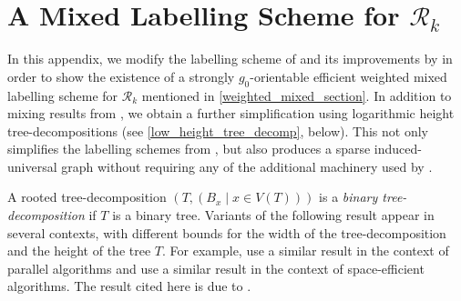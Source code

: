 \documentclass{patmorin}
\newcommand{\vida}[1]{\noindent{\color{pink} VD: #1}}
\newcommand{\defin}[1]{\emph{\textcolor{brightmaroon}{#1}}}
\newcommand{\calR}{\mathcal{R}}
\begin{document}
\setlength{\bibsep}{0.3ex plus 0.1ex minus 0.1ex}



\newpage
\appendix
{}
\section{A Mixed Labelling Scheme for \texorpdfstring{$\calR_k$}{Rk}}
\label{weighted_product_proof}

In this appendix, we modify the labelling scheme of \citet{dujmovic.esperet.ea:adjacency} and its improvements by \citet{gawrychowski.janczewski:simpler} in order to show the existence of a strongly $g_0$-orientable efficient weighted mixed labelling scheme for $\calR_k$ mentioned in \cref{weighted_mixed_section}.  In addition to mixing results from \cite{dujmovic.esperet.ea:adjacency,gawrychowski.janczewski:simpler}, we obtain a further simplification using logarithmic height tree-decompositions (see \cref{low_height_tree_decomp}, below).  This not only simplifies the labelling schemes from \cite{dujmovic.esperet.ea:adjacency,gawrychowski.janczewski:simpler}, but also produces a sparse induced-universal graph without requiring any of the additional machinery used by \citet{EJM23}.  

A rooted tree-decomposition $(T,(B_x\mid x\in V(T)))$ is a \defin{binary tree-decomposition} if $T$ is a binary tree. Variants of the following result appear in several contexts, with different bounds for the width of the tree-decomposition and the height of the tree $T$. For example, \citet{bodlaender.hagerup:parallel} use a similar result in the context of parallel algorithms and \citet{jain.tewari:space} use a similar result in the context of space-efficient algorithms. The result cited here is due to \citet{chatterjee.ibsen-jensen.ea:optimal}. 

\end{document}
